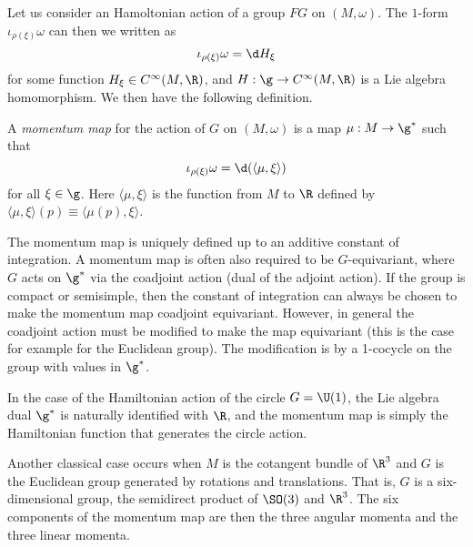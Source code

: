 \documentclass{worksheetclass}
\begin{document}
        Let us consider an Hamoltonian action of a group $FG$ on $(M,\omega)$. The $1$-form $\iota_{\rho(\xi)}\omega$ can then we written as
        \begin{equation}
            \iota_{\rho(\xi)}\omega= \d H_{\xi}
        \end{equation}
        for some function $H_{\xi}\in C^\infty(M,\R)$, and $H:\g\to C^\infty(M,\R)$ is a Lie algebra homomorphism. We then have the following definition.
        \begin{defn}
            A \emph{momentum map} for the action of $G$ on $(M,\omega)$ is a map $\mu:M\to\g^*$ such that
            \begin{equation}
                \iota_{\rho(\xi)}\omega=\d(\langle \mu,\xi\rangle)
            \end{equation}
            for all $\xi\in\g$. Here $\langle \mu,\xi\rangle$ is the function from $M$ to $\R$ defined by $\langle \mu,\xi\rangle(p)\equiv\langle \mu(p),\xi\rangle$.
        \end{defn}
        The momentum map is uniquely defined up to an additive constant of integration. A momentum map is often also required to be $G$-equivariant, where $G$ acts on $\g^*$ via the coadjoint action (dual of the adjoint action). If the group is compact or semisimple, then the constant of integration can always be chosen to make the momentum map coadjoint equivariant. However, in general the coadjoint action must be modified to make the map equivariant (this is the case for example for the Euclidean group). The modification is by a 1-cocycle on the group with values in $\g^*$.

        \begin{examp}
            In the case of the Hamiltonian action of the circle $G=\U(1)$, the Lie algebra dual $\g^*$ is naturally identified with $\R$, and the momentum map is simply the Hamiltonian function that generates the circle action.
        \end{examp}

        \begin{examp}
            Another classical case occurs when $M$ is the cotangent bundle of $\R^{3}$ and $G$ is the Euclidean group generated by rotations and translations. That is, $G$ is a six-dimensional group, the semidirect product of $\SO(3)$ and $\R^{3}$. The six components of the momentum map are then the three angular momenta and the three linear momenta.
        \end{examp}
\end{document}
